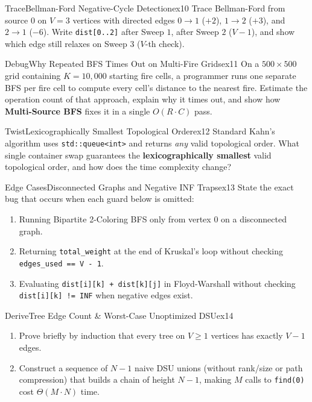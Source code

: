 \documentclass[11pt,a4paper]{article}
\theoremstyle{definition}
\begin{document}
\begin{tryitbox}{Trace}{Bellman-Ford Negative-Cycle Detection}{ex10}
Trace Bellman-Ford from source $0$ on $V = 3$ vertices with directed edges $0 \to 1$ ($+2$), $1 \to 2$ ($+3$), and $2 \to 1$ ($-6$). Write \texttt{dist[0..2]} after Sweep $1$, after Sweep $2$ ($V - 1$), and show which edge still relaxes on Sweep $3$ ($V$-th check).
\end{tryitbox}

\begin{tryitbox}{Debug}{Why Repeated BFS Times Out on Multi-Fire Grids}{ex11}
On a $500 \times 500$ grid containing $K = 10{,}000$ starting fire cells, a programmer runs one separate BFS per fire cell to compute every cell's distance to the nearest fire. Estimate the operation count of that approach, explain why it times out, and show how \textbf{Multi-Source BFS} fixes it in a single $O(R \cdot C)$ pass.
\end{tryitbox}

\begin{tryitbox}{Twist}{Lexicographically Smallest Topological Order}{ex12}
Standard Kahn's algorithm uses \texttt{std::queue<int>} and returns \emph{any} valid topological order. What single container swap guarantees the \textbf{lexicographically smallest} valid topological order, and how does the time complexity change?
\end{tryitbox}

\begin{tryitbox}{Edge Cases}{Disconnected Graphs and Negative INF Traps}{ex13}
State the exact bug that occurs when each guard below is omitted:
\begin{enumerate}
    \item Running Bipartite 2-Coloring BFS only from vertex $0$ on a disconnected graph.
    \item Returning \texttt{total\_weight} at the end of Kruskal's loop without checking \texttt{edges\_used == V - 1}.
    \item Evaluating \texttt{dist[i][k] + dist[k][j]} in Floyd-Warshall without checking \texttt{dist[i][k] != INF} when negative edges exist.
\end{enumerate}
\end{tryitbox}

\begin{tryitbox}{Derive}{Tree Edge Count \& Worst-Case Unoptimized DSU}{ex14}
\begin{enumerate}
    \item Prove briefly by induction that every tree on $V \ge 1$ vertices has exactly $V - 1$ edges.
    \item Construct a sequence of $N - 1$ naive DSU unions (without rank/size or path compression) that builds a chain of height $N - 1$, making $M$ calls to \texttt{find(0)} cost $\Theta(M \cdot N)$ time.
\end{enumerate}
\end{tryitbox}
\end{document}
